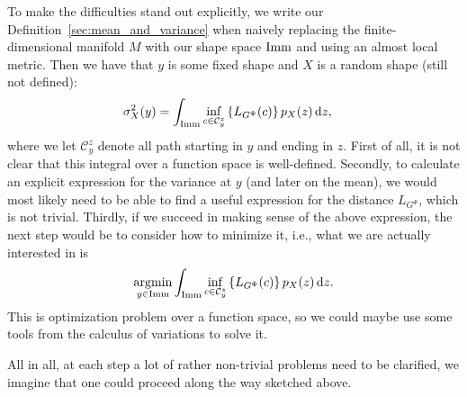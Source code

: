 To make the difficulties stand out explicitly, we write our Definition~\ref{sec:mean_and_variance} when naively replacing the finite-dimensional manifold $M$ with our shape space $\mathop{}\!\mathrm{Imm}$ and using an almost local metric. Then we have that $y$ is some fixed shape and $X$ is a random shape (still not defined):
\begin{align*}
  \sigma^2_X(y) &  = \int_{\mathop{}\!\mathrm{Imm}}
                  \inf_{c \in \mathcal{C}_{y}^z}
                  \left\{
                  L_{G^\Phi}(c)
                  \right\}
                  p_X(z)
                  \mathop{}\!\mathrm{d} z
  ,
\end{align*}
where we let $\mathcal{C}_y^z$ denote all path starting in $y$ and ending in $z$.
First of all, it is not clear that this integral over a function space is well-defined.
Secondly, to calculate an explicit expression for the variance at $y$ (and later on the mean), we would most likely need to be able to find a useful expression for the distance $L_{G^{\Phi}}$, which is not trivial.
Thirdly, if we succeed in making sense of the above expression, the next step would be to consider how to minimize it, i.e., what we are actually interested in is
\begin{equation*}
  \operatorname*{argmin}_{y \in \mathop{}\!\mathrm{Imm}}
  \int_{\mathop{}\!\mathrm{Imm}}
  \inf_{c \in \mathcal{C}_{y}^z}
  \left\{
    L_{G^\Phi}(c)
  \right\}
  p_X(z)
  \mathop{}\!\mathrm{d} z.
\end{equation*}
This is optimization problem over a function space, so we could maybe use some tools from the calculus of variations to solve it.

All in all, at each step a lot of rather non-trivial problems need to be clarified, we imagine that one could proceed along the way sketched above.


